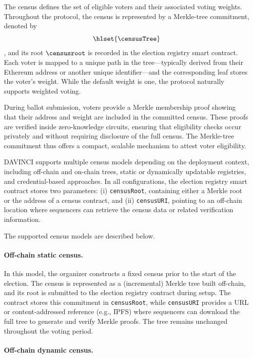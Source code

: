 The census defines the set of eligible voters and their associated voting weights. 
Throughout the protocol, the census is represented by a Merkle-tree commitment, denoted 
by $$\hlset{\censusTree}$$, and its root $\censusroot$ is recorded in the election registry smart 
contract. Each voter is mapped to a unique path in the tree---typically derived from 
their Ethereum address or another unique identifier---and the corresponding leaf stores 
the voter’s weight. While the default weight is one, the protocol naturally supports 
weighted voting.

During ballot submission, voters provide a Merkle membership proof showing that their 
address and weight are included in the committed census. These proofs are verified inside 
zero-knowledge circuits, ensuring that eligibility checks occur privately and without 
requiring disclosure of the full census. The Merkle-tree commitment thus offers a compact, 
scalable mechanism to attest voter eligibility.

DAVINCI supports multiple census models depending on the deployment context, including 
off-chain and on-chain trees, static or dynamically updatable registries, and 
credential-based approaches. In all configurations, the election registry smart 
contract stores two parameters:
(i) \texttt{censusRoot}, containing either a Merkle root or the address of a census 
contract, and 
(ii) \texttt{censusURI}, pointing to an off-chain location where sequencers can 
retrieve the census data or related verification information.

The supported census models are described below.

\paragraph{Off-chain static census.}

In this model, the organizer constructs a fixed census prior to the start of the election. 
The census is represented as a (incremental) Merkle tree built off-chain, and its root is 
submitted to the election registry contract during setup. The contract stores this 
commitment in \texttt{censusRoot}, while \texttt{censusURI} provides a URL or 
content-addressed reference (e.g., IPFS) where sequencers can download the full tree to 
generate and verify Merkle proofs. The tree remains unchanged throughout the voting 
period.

\paragraph{Off-chain dynamic census.} 

